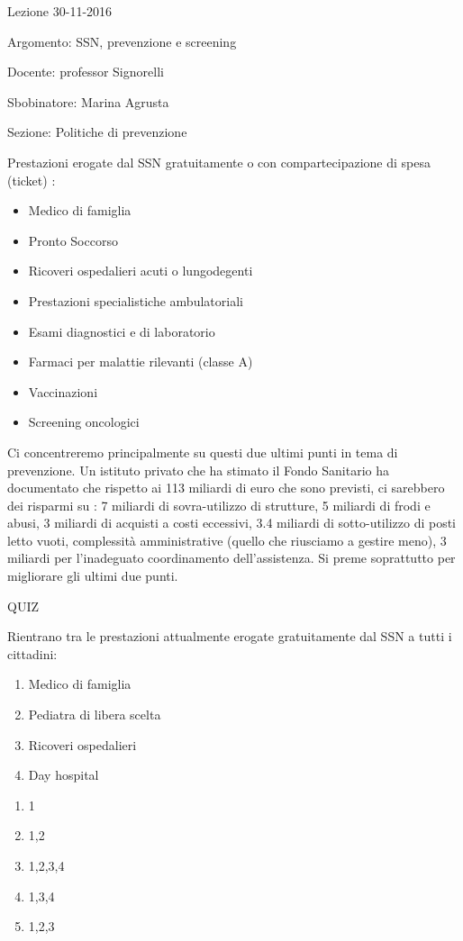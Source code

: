 \documentclass[]{article}
\date{}
\begin{document}
Lezione 30-11-2016

Argomento: SSN, prevenzione e screening

Docente: professor Signorelli

Sbobinatore: Marina Agrusta

Sezione: Politiche di prevenzione

Prestazioni erogate dal SSN gratuitamente o con compartecipazione di
spesa (ticket) :

\begin{itemize}
\item
  Medico di famiglia
\item
  Pronto Soccorso
\item
  Ricoveri ospedalieri acuti o lungodegenti
\item
  Prestazioni specialistiche ambulatoriali
\item
  Esami diagnostici e di laboratorio
\item
  Farmaci per malattie rilevanti (classe A)
\item
  Vaccinazioni
\item
  Screening oncologici
\end{itemize}

Ci concentreremo principalmente su questi due ultimi punti in tema di
prevenzione. Un istituto privato che ha stimato il Fondo Sanitario ha
documentato che rispetto ai 113 miliardi di euro che sono previsti, ci
sarebbero dei risparmi su : 7 miliardi di sovra-utilizzo di strutture, 5
miliardi di frodi e abusi, 3 miliardi di acquisti a costi eccessivi, 3.4
miliardi di sotto-utilizzo di posti letto vuoti, complessità
amministrative (quello che riusciamo a gestire meno), 3 miliardi per
l'inadeguato coordinamento dell'assistenza. Si preme soprattutto per
migliorare gli ultimi due punti.

QUIZ

Rientrano tra le prestazioni attualmente erogate gratuitamente dal SSN a
tutti i cittadini:

\begin{enumerate}
\def\labelenumi{\arabic{enumi}.}
\item
  Medico di famiglia
\item
  Pediatra di libera scelta
\item
  Ricoveri ospedalieri
\item
  Day hospital
\end{enumerate}

\begin{enumerate}
\def\labelenumi{\alph{enumi})}
\item
  1
\item
  1,2
\item
  1,2,3,4
\item
  1,3,4
\item
  1,2,3
\end{enumerate}
\end{document}
